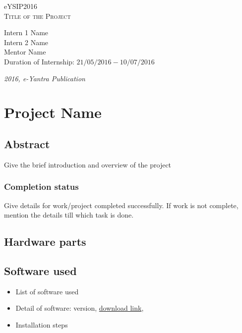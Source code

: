 \documentclass[a4paper,12pt,oneside]{book}
\begin{document}
\begin{titlepage}
\raggedright
{\Large eYSIP2016\\[1cm]}
{\Huge\scshape Title of the Project \\[.1in]}
\vfill
\begin{flushright}
{\large Intern 1 Name \\}
{\large Intern 2 Name \\}
{\large Mentor Name \\}
{\large Duration of Internship: $ 21/05/2016-10/07/2016 $ \\}
\end{flushright}

{\itshape 2016, e-Yantra Publication}
\end{titlepage}

\chapter[Project Tag]{Project Name}
\section*{Abstract}
Give the brief introduction and overview of the project

\subsection*{Completion status}
Give details for work/project completed successfully. If work is not
complete, mention the details till which task is done.

\section{Hardware parts}

\section{Software used}
\begin{itemize}
  \item List of software used 
  \item Detail of software: version, \href{http://www.amazon.com}{download link}, 
  \item Installation steps
\end{itemize}
\end{document}
